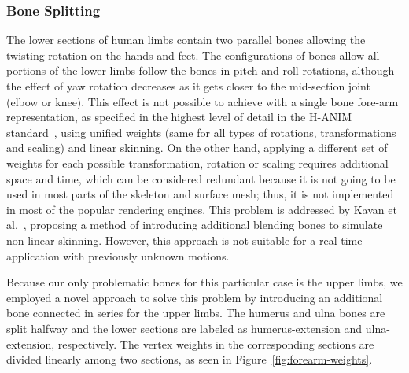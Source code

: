 \documentclass[number,preprint,review,12pt]{elsarticle}
\begin{document}
\subsubsection{Bone Splitting}
The lower sections of human limbs contain two parallel bones allowing the twisting rotation on the hands and feet. The configurations of bones allow all portions of the lower limbs follow the bones in pitch and roll rotations, although the effect of yaw rotation decreases as it gets closer to the mid-section joint (elbow or knee). This effect is not possible to achieve with a single bone fore-arm representation, as specified in the highest level of detail in the H-ANIM standard~\cite{HANIM}, using unified weights (same for all types of rotations, transformations and scaling) and linear skinning. On the other hand, applying a different set of weights for each possible transformation, rotation or scaling requires additional space and time, which can be considered redundant because it is not going to be used in most parts of the skeleton and surface mesh; thus, it is not implemented in most of the popular rendering engines. This problem is addressed by Kavan et al.~\cite{Kavan2009}, proposing a method of introducing additional blending bones to simulate non-linear skinning. However, this approach is not suitable for a real-time application with previously unknown motions. 

Because our only problematic bones for this particular case is the upper limbs, we employed a novel approach to solve this problem by introducing an additional bone connected in series for the upper limbs. The humerus and ulna bones are split halfway and the lower sections are labeled as humerus-extension and ulna-extension, respectively. The vertex weights in the corresponding sections are divided linearly among two sections, as seen in Figure~\ref{fig:forearm-weights}. 
\end{document}
